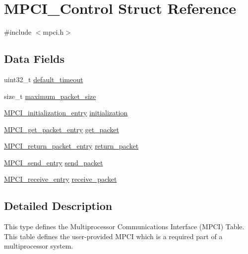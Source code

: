 \hypertarget{structMPCI__Control}{}\section{M\+P\+C\+I\+\_\+\+Control Struct Reference}
\label{structMPCI__Control}


{\ttfamily \#include $<$mpci.\+h$>$}

\subsection*{Data Fields}
\begin{DoxyCompactItemize}
\item 
uint32\+\_\+t \mbox{\hyperlink{structMPCI__Control_a8bbaadcf3dbc6a89d973d7600f294366}{default\+\_\+timeout}}
\item 
size\+\_\+t \mbox{\hyperlink{structMPCI__Control_a9d941e28d8d0c332fc3ce5d700ed0487}{maximum\+\_\+packet\+\_\+size}}
\item 
\mbox{\hyperlink{group__RTEMSScoreMPCI_ga40ecc89f5ace847ed93f57e06ef0f27c}{M\+P\+C\+I\+\_\+initialization\+\_\+entry}} \mbox{\hyperlink{structMPCI__Control_a9a1562088b03129f4cc90818fdf168be}{initialization}}
\item 
\mbox{\hyperlink{group__RTEMSScoreMPCI_gaff830d8b635714b2f669bfe612744244}{M\+P\+C\+I\+\_\+get\+\_\+packet\+\_\+entry}} \mbox{\hyperlink{structMPCI__Control_af9c8d69c57f2689006a0b8c4d39e4070}{get\+\_\+packet}}
\item 
\mbox{\hyperlink{group__RTEMSScoreMPCI_gaa1869d09a5e31b0810c9efda6171ffa4}{M\+P\+C\+I\+\_\+return\+\_\+packet\+\_\+entry}} \mbox{\hyperlink{structMPCI__Control_a4830b90775aec0a366c007a5dc106654}{return\+\_\+packet}}
\item 
\mbox{\hyperlink{group__RTEMSScoreMPCI_gaeacb0c0d07a93283f07abcc5727a23a8}{M\+P\+C\+I\+\_\+send\+\_\+entry}} \mbox{\hyperlink{structMPCI__Control_aafd1390d1aa6de603ecdeaa622917e64}{send\+\_\+packet}}
\item 
\mbox{\hyperlink{group__RTEMSScoreMPCI_ga87bfcaa7cd058fd748d6f4b7f530448b}{M\+P\+C\+I\+\_\+receive\+\_\+entry}} \mbox{\hyperlink{structMPCI__Control_a917655da0f5bbead19596cc0e3388545}{receive\+\_\+packet}}
\end{DoxyCompactItemize}


\subsection{Detailed Description}
This type defines the Multiprocessor Communications Interface (M\+P\+CI) Table. This table defines the user-\/provided M\+P\+CI which is a required part of a multiprocessor system.


